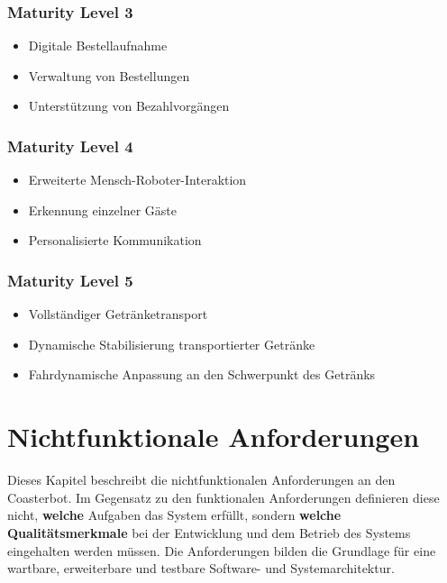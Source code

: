 \subsubsection{Maturity Level 3}\label{maturity-level-3}

\begin{itemize}
\tightlist
\item
  Digitale Bestellaufnahme
\item
  Verwaltung von Bestellungen
\item
  Unterstützung von Bezahlvorgängen
\end{itemize}

\subsubsection{Maturity Level 4}\label{maturity-level-4}

\begin{itemize}
\tightlist
\item
  Erweiterte Mensch-Roboter-Interaktion
\item
  Erkennung einzelner Gäste
\item
  Personalisierte Kommunikation
\end{itemize}

\subsubsection{Maturity Level 5}\label{maturity-level-5}

\begin{itemize}
\tightlist
\item
  Vollständiger Getränketransport
\item
  Dynamische Stabilisierung transportierter Getränke
\item
  Fahrdynamische Anpassung an den Schwerpunkt des Getränks
\end{itemize}

\section{Nichtfunktionale
Anforderungen}\label{nichtfunktionale-anforderungen}

Dieses Kapitel beschreibt die nichtfunktionalen Anforderungen an den
Coasterbot. Im Gegensatz zu den funktionalen Anforderungen definieren
diese nicht, \textbf{welche} Aufgaben das System erfüllt, sondern
\textbf{welche Qualitätsmerkmale} bei der Entwicklung und dem Betrieb
des Systems eingehalten werden müssen. Die Anforderungen bilden die
Grundlage für eine wartbare, erweiterbare und testbare Software- und
Systemarchitektur.

